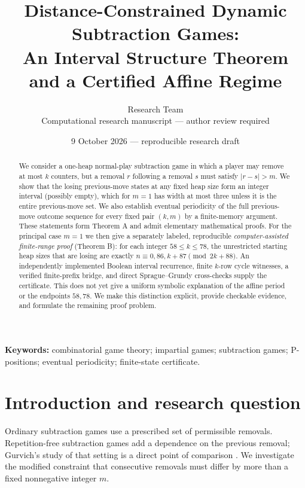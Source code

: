 \documentclass[11pt]{article}
\title{\textbf{Distance-Constrained Dynamic Subtraction Games:}\\
An Interval Structure Theorem and a Certified Affine Regime}
\author{Research Team\\\small Computational research manuscript --- author review required}
\date{9 October 2026 --- reproducible research draft}
\begin{document}
\maketitle
\begin{abstract}
We consider a one-heap normal-play subtraction game in which a player may remove
at most $k$ counters, but a removal $r$ following a removal $s$ must satisfy
$|r-s|>m$.  We show that the losing previous-move states at any fixed heap size
form an integer interval (possibly empty), which for $m=1$ has width at most
three unless it is the entire previous-move set.  We also establish eventual
periodicity of the full previous-move outcome sequence for every fixed pair
$(k,m)$ by a finite-memory argument.  These statements form Theorem A and
admit elementary mathematical proofs.  For the principal case $m=1$ we then
give a separately labeled, reproducible \emph{computer-assisted finite-range
proof} (Theorem B): for each integer $58\le k\le78$, the unrestricted starting
heap sizes that are losing are exactly
$n\equiv0,86,k+87\pmod{2k+88}$.  An independently implemented
Boolean interval recurrence, finite $k$-row cycle witnesses, a verified
finite-prefix bridge, and direct Sprague--Grundy cross-checks supply the
certificate.  This does not yet give a uniform symbolic explanation of the
affine period or the endpoints $58,78$.  We make this distinction explicit,
provide checkable evidence, and formulate the remaining proof problem.
\end{abstract}

\textbf{Keywords:} combinatorial game theory; impartial games; subtraction
games; P-positions; eventual periodicity; finite-state certificate.
\tableofcontents
\newpage

\section{Introduction and research question}
Ordinary subtraction games use a prescribed set of permissible removals.
Repetition-free subtraction games add a dependence on the previous removal;
Gurvich's study of that setting is a direct point of comparison
\cite{gurvich2012}.  We investigate the modified constraint that consecutive
removals must differ by more than a fixed nonnegative integer $m$.
\end{document}
